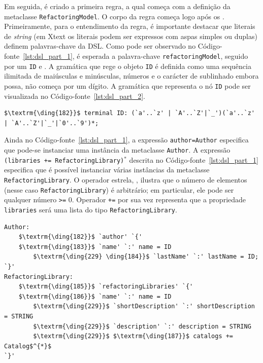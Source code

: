 Em seguida, é criado a primeira regra, a qual começa com a definição da metaclasse \texttt{RefactoringModel}. O corpo da regra começa logo após os \aspas{\texttt{:}}. Primeiramente, para o entendimento da regra, é importante destacar que literais de \textit{string} (em Xtext os literais podem ser expressos com aspas simples ou duplas) definem palavras-chave da DSL. Como pode ser observado no Código-fonte~\ref{lst:dsl_part_1}, é esperada a palavra-chave \texttt{refactoringModel}, seguido por um \texttt{ID} e \aspas{\{}. A gramática que rege o objeto \texttt{ID} é definida como uma sequência ilimitada de maiúsculas e minúsculas, números e o carácter de sublinhado embora possa, não começa por um dígito. A gramática que representa o nó \texttt{ID} pode ser visualizada no Código-fonte~\ref{lst:dsl_part_2}. 

\begin{lstlisting}[language=Xtext, frame=single, basicstyle=\scriptsize, mathescape=true, label={lst:dsl_part_2}, caption={Gramática da DSL - parte 2}]
	$\textrm{\ding{182}}$ terminal ID: (`a'..`z' | `A'..`Z'|`_')(`a'..`z' | `A'..`Z'|`_'|`0'..`9')*;
\end{lstlisting}

Ainda no Código-fonte~\ref{lst:dsl_part_1}, a expressão \texttt{author=Author} especifica que pode-se instanciar uma instância da metaclasse \texttt{Author}. A expressão \texttt{(libraries += RefactoringLibrary)$^{*}$} descrita no Código-fonte~\ref{lst:dsl_part_1} especifica que é possível  instanciar várias instâncias da metaclasse \texttt{RefactoringLibrary}. O operador estrela, \aspas{\texttt{*}}, ilustra que o número de elementos (nesse caso \texttt{RefactoringLibrary}) é arbitrário; em particular, ele pode ser qualquer número \texttt{>=} 0. Operador \texttt{+=} por sua vez representa que a propriedade \texttt{libraries} será uma lista do tipo \texttt{RefactoringLibrary}.

\begin{lstlisting}[language=Xtext, frame=single, basicstyle=\scriptsize, mathescape=true, label={lst:dsl_part_3}, caption={Gramática da DSL - parte 3}]
Author:
	$\textrm{\ding{182}}$ `author' `{'
	$\textrm{\ding{183}}$ `name' `:' name = ID  
		$\textrm{\ding{229} \ding{184}}$ `lastName' `:' lastName = ID; 
`}'
RefactoringLibrary:
	$\textrm{\ding{185}}$ `refactoringLibraries' `{'
	$\textrm{\ding{186}}$ `name' `:' name = ID  
		$\textrm{\ding{229}}$ `shortDescription' `:' shortDescription = STRING
		$\textrm{\ding{229}}$ `description' `:' description = STRING
		$\textrm{\ding{229}}$ $\textrm{\ding{187}}$ catalogs += Catalog$^{*}$
`}'
\end{lstlisting}

